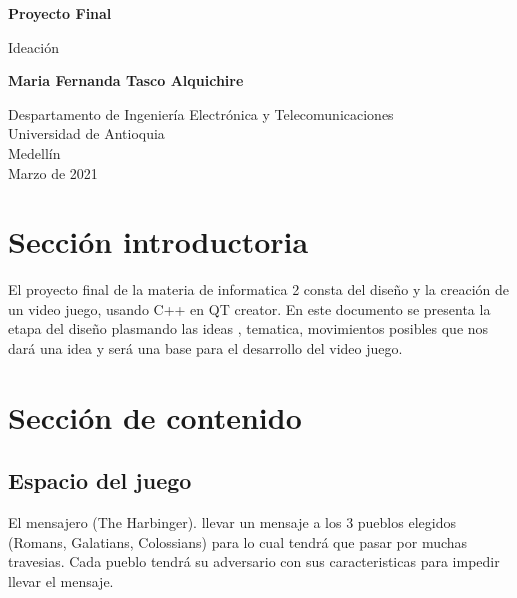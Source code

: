 \documentclass{article}
\begin{document}
\begin{titlepage}
    \begin{center}
        \vspace*{1cm}
            
        \Huge
        \textbf{Proyecto Final}
            
        \vspace{0.5cm}
        \LARGE
        Ideación
            
        \vspace{1.5cm}
            
        \textbf{Maria Fernanda Tasco Alquichire}
            
        \vfill
            
        \vspace{0.8cm}
            
        \Large
        Despartamento de Ingeniería Electrónica y Telecomunicaciones\\
        Universidad de Antioquia\\
        Medellín\\
        Marzo de 2021
            
    \end{center}
\end{titlepage}

\tableofcontents
\newpage
\section{Sección introductoria}\label{intro}
El proyecto final de la materia de informatica 2 consta del diseño y la creación de un video juego, usando C++ en QT creator. En este documento se presenta la etapa del diseño plasmando las ideas \cite{ideas}, tematica, movimientos posibles que nos dará una idea y será una base para el desarrollo del video juego.

\section{Sección de contenido} \label{contenido}

\subsection{Espacio del juego}
El mensajero (The Harbinger). llevar un mensaje a los 3 pueblos elegidos (Romans, Galatians, Colossians) para lo cual tendrá que pasar por muchas travesias.
Cada pueblo tendrá su adversario con sus caracteristicas para impedir llevar el mensaje.
\end{document}
